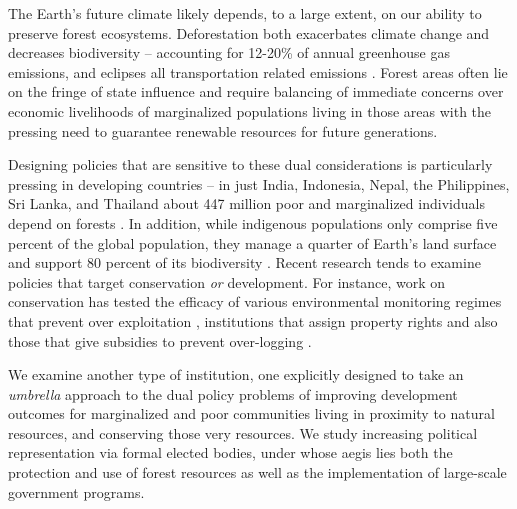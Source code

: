 \documentclass[12pt,reqno]{article}
\begin{document}

The Earth's future climate likely depends, to a large extent, on our ability to preserve forest ecosystems. Deforestation both exacerbates climate change and decreases biodiversity \parencite{bonan2008forests} -- accounting for 12-20\% of annual greenhouse gas emissions, and eclipses all transportation related emissions \parencite{solomon2007ipcc}. Forest areas often lie on the fringe of state influence and require balancing of immediate concerns over economic livelihoods of marginalized populations living in those areas with the pressing need to guarantee renewable resources for future generations. 

Designing policies that are sensitive to these dual considerations is particularly pressing in developing countries --  in just India, Indonesia, Nepal, the Philippines, Sri Lanka, and Thailand about 447 million poor and marginalized individuals depend on forests \parencite{lynch1995balancing}. In addition, while indigenous populations only comprise five percent of the global population, they manage a quarter of Earth's land surface and support 80 percent of its biodiversity \parencite{garnett2018spatial}. Recent research tends to examine policies that target conservation {\it or} development. For instance, work on conservation has tested the efficacy of various environmental monitoring regimes that prevent over exploitation \parencite{anderson2019non,buntaine2020combining,metaketaiii,Christinsen2020}, institutions that assign property rights \parencite{buntaine2015titling,baragwanath2020collective} and also those that give subsidies to prevent over-logging \parencite{samii2014effects,jayachandran2017cash}. 






We examine another type of institution, one explicitly designed to take an \emph{umbrella} approach to the dual policy problems of improving development outcomes for marginalized and poor communities living in proximity to natural resources, and conserving those very resources. We study increasing political representation via formal elected bodies, under whose aegis lies both the protection and use of forest resources as well as the implementation of large-scale government programs.  
\end{document}
